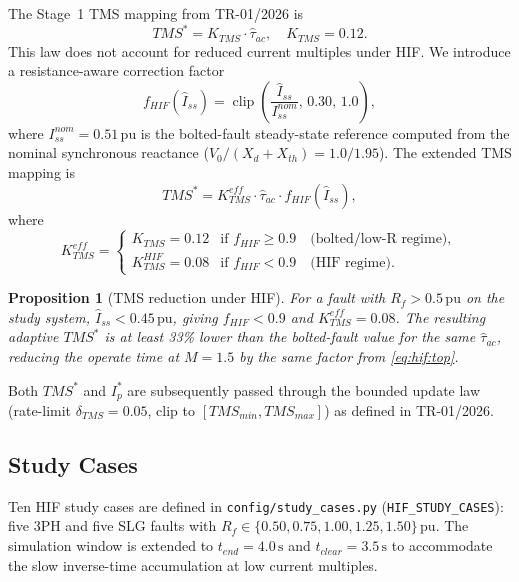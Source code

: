 \documentclass[12pt,a4paper]{article}
\theoremstyle{definition}
\theoremstyle{plain}
\newtheorem{proposition}{Proposition}[section]
\newcommand{\pu}{\,\text{pu}}
\newcommand{\sss}{\,\text{s}}
\begin{document}
The Stage~1 TMS mapping from TR-01/2026 is
\begin{equation}
  TMS^* = K_{TMS} \cdot \hat{\tau}_{ac},
  \quad K_{TMS} = 0.12.
  \label{eq:hif:tms_base}
\end{equation}
This law does not account for reduced current multiples under HIF.
We introduce a resistance-aware correction factor
\begin{equation}
  f_{HIF}(\hat{I}_{ss}) = \operatorname{clip}\!\left(\frac{\hat{I}_{ss}}{I_{ss}^{nom}},\, 0.30,\, 1.0\right),
  \label{eq:hif:factor}
\end{equation}
where $I_{ss}^{nom} = 0.51\pu$ is the bolted-fault steady-state reference
computed from the nominal synchronous reactance ($V_0/(X_d + X_{th}) = 1.0/1.95$).
The extended TMS mapping is
\begin{equation}
  TMS^* = K_{TMS}^{eff} \cdot \hat{\tau}_{ac} \cdot f_{HIF}(\hat{I}_{ss}),
  \label{eq:hif:tms_new}
\end{equation}
where
\begin{equation}
  K_{TMS}^{eff} =
  \begin{cases}
    K_{TMS}     = 0.12 & \text{if } f_{HIF} \geq 0.9 \quad\text{(bolted/low-R regime)}, \\
    K_{TMS}^{HIF} = 0.08 & \text{if } f_{HIF} < 0.9 \quad\text{(HIF regime)}.
  \end{cases}
  \label{eq:hif:Keff}
\end{equation}

\begin{proposition}[TMS reduction under HIF]
For a fault with $R_f > 0.5\pu$ on the study system, $\hat{I}_{ss} < 0.45\pu$,
giving $f_{HIF} < 0.9$ and $K_{TMS}^{eff} = 0.08$.  The resulting adaptive
$TMS^*$ is at least 33\% lower than the bolted-fault value for the same
$\hat{\tau}_{ac}$, reducing the operate time at $M = 1.5$ by the same factor
from \cref{eq:hif:top}.
\end{proposition}

Both $TMS^*$ and $I_p^*$ are subsequently passed through the bounded update
law (rate-limit $\delta_{TMS} = 0.05$, clip to $[TMS_{min}, TMS_{max}]$) as
defined in TR-01/2026.

\subsection{Study Cases}
\label{sec:hif:cases}

Ten HIF study cases are defined in \texttt{config/study\_cases.py}
(\texttt{HIF\_STUDY\_CASES}): five 3PH and five SLG faults with
$R_f \in \{0.50, 0.75, 1.00, 1.25, 1.50\}\pu$.  The simulation window
is extended to $t_{end} = 4.0\sss$ and $t_{clear} = 3.5\sss$ to accommodate
the slow inverse-time accumulation at low current multiples.
\end{document}
